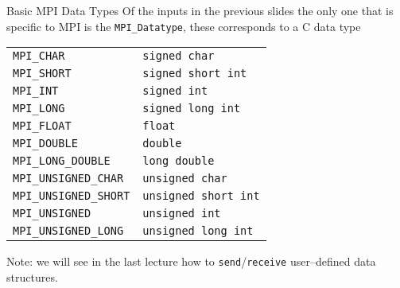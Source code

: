 \documentclass[xcolor={svgnames,usenames}]{beamer}
\begin{document}
\begin{frame}[fragile]{Basic MPI Data Types}
Of the inputs in the previous slides the only one that is specific to MPI is the \texttt{MPI_Datatype}, these corresponds to a C data type
\begin{center}
	\begin{tabular}{ll}
		\toprule
		\texttt{MPI_CHAR} & \texttt{signed char} \\
		\texttt{MPI_SHORT} & \texttt{signed short int} \\
		\texttt{MPI_INT} & \texttt{signed int} \\
		\texttt{MPI_LONG} & \texttt{signed long int} \\
		\texttt{MPI_FLOAT} & \texttt{float} \\
		\texttt{MPI_DOUBLE} & \texttt{double} \\
		\texttt{MPI_LONG_DOUBLE} & \texttt{long double} \\
		\midrule
		\texttt{MPI_UNSIGNED_CHAR} & \texttt{unsigned char}\\
		\texttt{MPI_UNSIGNED_SHORT} & \texttt{unsigned short int}\\
		\texttt{MPI_UNSIGNED} & \texttt{unsigned int} \\
		\texttt{MPI_UNSIGNED_LONG} & \texttt{unsigned long int} \\
		\bottomrule
	\end{tabular}
\end{center}

\alert{Note}: we will see in the last lecture how to \texttt{send}/\texttt{receive} user--defined data structures.
\end{frame}
\end{document}
